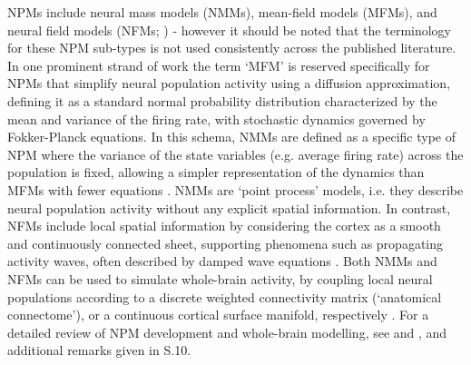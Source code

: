 \documentclass[12pt,twoside]{article}
\begin{document}
NPMs include neural mass models (NMMs), mean-field models (MFMs), and neural field models (NFMs; \citealp{deco2008dynamic, bojak2014neural}) - however it should be noted that the terminology for these NPM sub-types is not used consistently across the published literature. In one prominent strand of work \citep{deco2008dynamic, moran2013neural} the term `MFM' is reserved specifically for NPMs that simplify neural population activity using a diffusion approximation, defining it as a standard normal probability distribution characterized by the mean and variance of the firing rate, with stochastic dynamics governed by Fokker-Planck equations. In this schema, NMMs are defined as a specific type of NPM where the variance of the state variables (e.g. average firing rate) across the population is fixed, allowing a simpler representation of the dynamics than MFMs with fewer equations \citep{breakspear2017dynamic}. NMMs are `point process' models, i.e. they describe neural population activity without any explicit spatial information. In contrast, NFMs include local spatial information by considering the cortex as a smooth and continuously connected sheet, supporting phenomena such as propagating activity waves, often described by damped wave equations \citep{pinotsis2014neural, breakspear2017dynamic}. Both NMMs and NFMs can be used to simulate whole-brain activity, by coupling local neural populations according to a discrete weighted connectivity matrix (`anatomical connectome'), or a continuous cortical surface manifold, respectively \citep{breakspear2017dynamic, schirner2018inferring, glomb2021computational, robinson2016eigenmodes, nunez2006electric, visser2017standing}. For a detailed review of NPM development and whole-brain modelling, see \citet{griffiths2022whole} and \citet{chow2020before}, and additional remarks given in S.10. 



\end{document}
